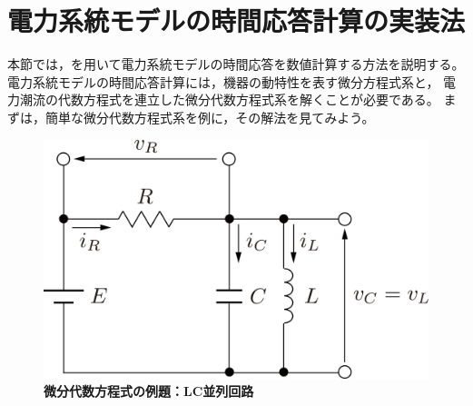\documentclass[tombow,dvipdfmx]{corona-a5-1.1}
\begin{document}
\section{電力系統モデルの時間応答計算の実装法}\label{sec:timerescal}

本節では，\matlab を用いて電力系統モデルの時間応答を数値計算する方法を説明する。
電力系統モデルの時間応答計算には，機器の動特性を表す微分方程式系と，
電力潮流の代数方程式を連立した微分代数方程式系を解くことが必要である。
まずは，簡単な微分代数方程式系を例に，その解法を見てみよう。

\begin{figure}[t]
  \centering
  \includegraphics[width = .5\linewidth]{figs/circkawaguchi}
  \medskip
  \caption{\textbf{微分代数方程式の例題：LC並列回路}}
  \label{fig:RLC}
  \medskip
\end{figure}
\end{document}
